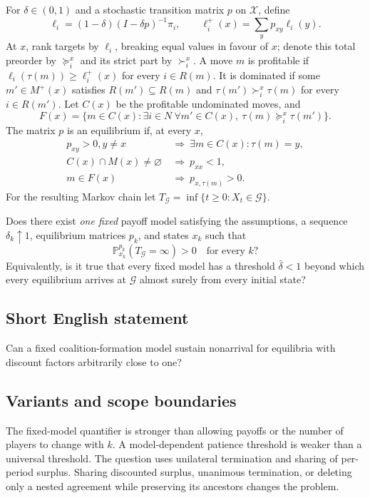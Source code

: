 \documentclass[11pt,a4paper]{article}
\begin{document}
For $\delta\in(0,1)$ and a stochastic transition matrix $p$ on $\mathcal X$, define
\[
 \ell_i=(1-\delta)(I-\delta p)^{-1}\pi_i,\qquad
 \ell_i^+(x)=\sum_y p_{xy}\ell_i(y).
\]
At $x$, rank targets by $\ell_i$, breaking equal values in favour of $x$; denote this total preorder by $\succeq_i^x$ and its strict part by $\succ_i^x$. A move $m$ is profitable if
$\ell_i(\tau(m))\geq\ell_i^+(x)$ for every $i\in R(m)$. It is dominated if some $m'\in M^+(x)$ satisfies $R(m')\subseteq R(m)$ and
$\tau(m')\succ_i^x\tau(m)$ for every $i\in R(m')$.
Let $C(x)$ be the profitable undominated moves, and
\[
 F(x)=\{m\in C(x):\exists i\in N\ \forall m'\in C(x),\
                  \tau(m)\succeq_i^x\tau(m')\}.
\]
The matrix $p$ is an equilibrium if, at every $x$,
\begin{align*}
 p_{xy}>0, y\neq x&\ \Longrightarrow\ \exists m\in C(x):\tau(m)=y,\\
 C(x)\cap M(x)\neq\varnothing&\ \Longrightarrow\ p_{xx}<1,\\
 m\in F(x)&\ \Longrightarrow\ p_{x,\tau(m)}>0.
\end{align*}
For the resulting Markov chain let $T_{\mathcal G}=\inf\{t\geq0:X_t\in\mathcal G\}$.

Does there exist \emph{one fixed} payoff model satisfying the assumptions, a sequence $\delta_k\uparrow1$, equilibrium matrices $p_k$, and states $x_k$ such that
\[
 \mathbb P_{x_k}^{p_k}(T_{\mathcal G}=\infty)>0\quad\text{for every }k?
\]
Equivalently, is it true that every fixed model has a threshold $\bar\delta<1$ beyond which every equilibrium arrives at $\mathcal G$ almost surely from every initial state?

\subsection*{Short English statement}
Can a fixed coalition-formation model sustain nonarrival for equilibria with discount factors arbitrarily close to one?

\subsection*{Variants and scope boundaries}
The fixed-model quantifier is stronger than allowing payoffs or the number of players to change with $k$. A model-dependent patience threshold is weaker than a universal threshold. The question uses unilateral termination and sharing of per-period surplus. Sharing discounted surplus, unanimous termination, or deleting only a nested agreement while preserving its ancestors changes the problem.
\end{document}
